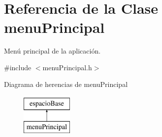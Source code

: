 \hypertarget{classmenu_principal}{}\section{Referencia de la Clase menu\+Principal}
\label{classmenu_principal}


Menú principal de la aplicación.  




{\ttfamily \#include $<$menu\+Principal.\+h$>$}

Diagrama de herencias de menu\+Principal\begin{figure}[H]
\begin{center}
\leavevmode
\includegraphics[height=2.000000cm]{classmenu_principal}
\end{center}
\end{figure}
